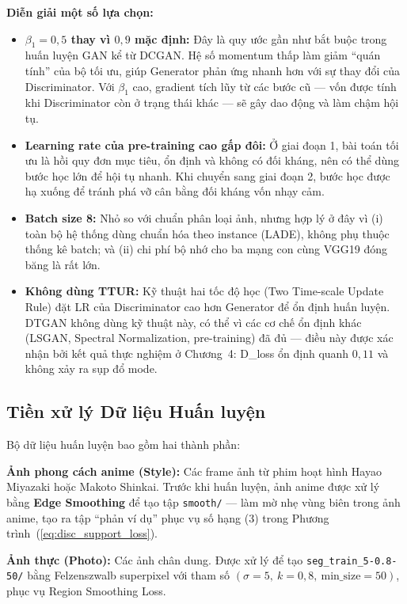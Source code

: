 \textbf{Diễn giải một số lựa chọn:}
\begin{itemize}
    \item \textbf{$\beta_1 = 0{,}5$ thay vì $0{,}9$ mặc định:} Đây là quy ước gần như bắt buộc trong huấn luyện GAN kể từ DCGAN. Hệ số momentum thấp làm giảm ``quán tính'' của bộ tối ưu, giúp Generator phản ứng nhanh hơn với sự thay đổi của Discriminator. Với $\beta_1$ cao, gradient tích lũy từ các bước cũ --- vốn được tính khi Discriminator còn ở trạng thái khác --- sẽ gây dao động và làm chậm hội tụ.
    \item \textbf{Learning rate của pre-training cao gấp đôi:} Ở giai đoạn 1, bài toán tối ưu là hồi quy đơn mục tiêu, ổn định và không có đối kháng, nên có thể dùng bước học lớn để hội tụ nhanh. Khi chuyển sang giai đoạn 2, bước học được hạ xuống để tránh phá vỡ cân bằng đối kháng vốn nhạy cảm.
    \item \textbf{Batch size 8:} Nhỏ so với chuẩn phân loại ảnh, nhưng hợp lý ở đây vì (i) toàn bộ hệ thống dùng chuẩn hóa theo instance (LADE), không phụ thuộc thống kê batch; và (ii) chi phí bộ nhớ cho ba mạng con cùng VGG19 đóng băng là rất lớn.
    \item \textbf{Không dùng TTUR:} Kỹ thuật hai tốc độ học (Two Time-scale Update Rule) đặt LR của Discriminator cao hơn Generator để ổn định huấn luyện. DTGAN không dùng kỹ thuật này, có thể vì các cơ chế ổn định khác (LSGAN, Spectral Normalization, pre-training) đã đủ --- điều này được xác nhận bởi kết quả thực nghiệm ở Chương~4: D\_loss ổn định quanh $0{,}11$ và không xảy ra sụp đổ mode.
\end{itemize}

\subsection{Tiền xử lý Dữ liệu Huấn luyện}
\label{subsec:data_preprocessing}

Bộ dữ liệu huấn luyện bao gồm hai thành phần:

\textbf{Ảnh phong cách anime (Style):} Các frame ảnh từ phim hoạt hình Hayao Miyazaki hoặc Makoto Shinkai. Trước khi huấn luyện, ảnh anime được xử lý bằng \textbf{Edge Smoothing} để tạo tập \texttt{smooth/} --- làm mờ nhẹ vùng biên trong ảnh anime, tạo ra tập ``phản ví dụ'' phục vụ số hạng (3) trong Phương trình~(\ref{eq:disc_support_loss}).

\textbf{Ảnh thực (Photo):} Các ảnh chân dung. Được xử lý để tạo \texttt{seg\_train\_5-0.8-50/} bằng Felzenszwalb superpixel với tham số $(\sigma=5,\ k=0{,}8,\ \text{min\_size}=50)$, phục vụ Region Smoothing Loss.

